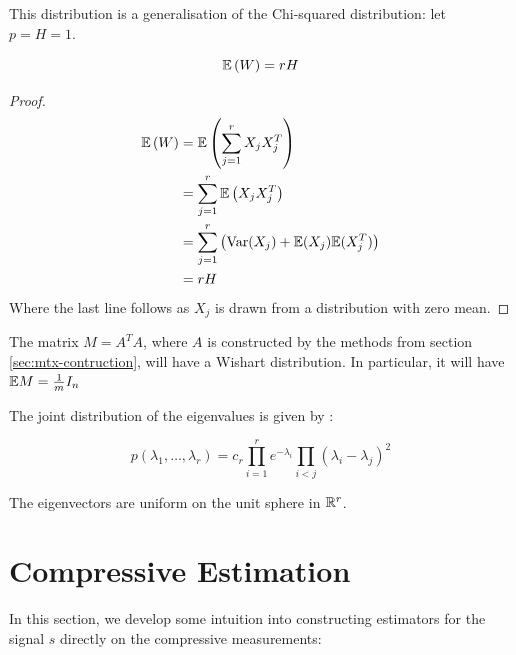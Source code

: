 \documentclass{article}
\begin{document}
\begin{remark}
This distribution is a generalisation of the Chi-squared distribution: let \(p = H = 1\). 
\end{remark}

\begin{theorem}
\begin{equation}
{\mathbb{E}}\left(W\right) = rH
\end{equation}
\end{theorem}
\begin{proof}
\begin{align*}
{\mathbb{E}}\left(W\right) &= {\mathbb{E}}\left(\sum_{j=1}^r X_j X_j^T\right) \\
&= \sum_{j=1}^r {\mathbb{E}}\left(X_jX_j^T\right) \\
&= \sum_{j=1}^r \left( \mathrm{Var}(X_j) + {\mathbb{E}}(X_j) {\mathbb{E}}(X_j^T)   \right) \\
&= rH 
\end{align*}
Where the last line follows as \(X_j\) is drawn from a distribution with zero mean.
\end{proof}

\begin{remark}
The matrix \(M = A^TA\), where \(A\) is constructed by the methods from section \ref{sec:mtx-contruction}, will have a Wishart distribution. In particular, it will have \({\mathbb{E}} M = \frac{1}{m}I_n\) 
\label{remark: exp AtA}
\end{remark}

The joint distribution of the eigenvalues is given by \cite{levequeMatrices}:

\begin{equation}
p\left(\lambda_1, \ldots, \lambda_r\right) = c_r \prod_{i=1}^r e^{-\lambda_i}\prod_{i<j}\left(\lambda_i - \lambda_j\right)^2
\end{equation}

The eigenvectors are uniform on the unit sphere in \({\mathbb{R}}^{r}\).

\section{Compressive Estimation} \label{sec:estimation}
In this section, we develop some intuition into constructing estimators for the signal \(s\) directly on the compressive measurements:
\end{document}
